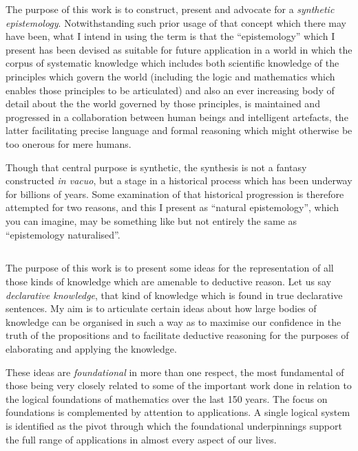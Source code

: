 \documentclass[10pt,titlepage]{book}
\begin{document}
The purpose of this work is to construct, present and advocate for a \emph{synthetic epistemology}.
Notwithstanding such prior usage of that concept which there may have been, what I intend in using the term is that the ``epistemology'' which I present has been devised as suitable for future application in a world in which the corpus of systematic knowledge which includes both scientific knowledge of the principles which govern the world (including the logic and mathematics which enables those principles to be articulated) and also an ever increasing body of detail about the the world governed by those principles, is maintained and progressed in a collaboration between human beings and intelligent artefacts, the latter facilitating precise language and formal reasoning which might otherwise be too onerous for mere humans.

Though that central purpose is synthetic, the synthesis is not a fantasy constructed \emph{in vacuo}, but a stage in a historical process which has been underway for billions of years.
Some examination of that historical progression is therefore attempted for two reasons, and this I present as ``natural epistemology'', which you can imagine, may be something like but not entirely the same as ``epistemology naturalised''.

\subsection{}

The purpose of this work is to present some ideas for the representation of all those kinds of knowledge which are amenable to deductive reason.
Let us say \emph{declarative knowledge}, that kind of knowledge which is found in true declarative sentences.
My aim is to articulate certain ideas about how large bodies of knowledge can be organised in such a way as to maximise our confidence in the truth of the propositions and to facilitate deductive reasoning for the purposes of elaborating and applying the knowledge.

These ideas are \emph{foundational} in more than one respect, the most fundamental of those being very closely related to some of the important work done in relation to the logical foundations of mathematics over the last 150 years.
The focus on foundations is complemented by attention to applications.
A single logical system is identified as the pivot through which the foundational underpinnings support the full range of applications in almost every aspect of our lives.
\end{document}
